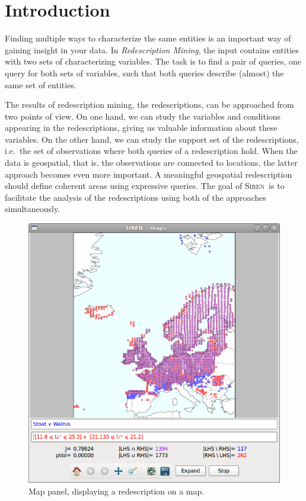 \documentclass{sig-alternate}
\newcommand{\note}[1]{{\color{red}#1}}
\newcommand{\Siren}{\textsc{Siren}}
\begin{document}

\section{Introduction}
Finding multiple ways to characterize the same entities is an
important way of gaining insight in your data.  In \emph{Redescription
Mining}, the input contains entities with two sets of characterizing
variables. The task is to find a pair of queries, one query for both
sets of variables, such that both queries describe (almost) the same
set of entities.

The results of redescription mining, the redescriptions, can be
approached from two points of view. On one hand, we can study the
variables and conditions appearing in the redescriptions, giving us
valuable information about these variables. On the other hand, we can
study the support set of the redescriptions, i.e.\ the set of
observations where both queries of a redescription hold. When the data
is geospatial, that is, the observations are connected to locations, the
latter approach becomes even more important. A meaningful geospatial
redescription should define coherent areas using expressive
queries. The goal of \Siren\ is to facilitate the analysis of the
redescriptions using both of the approaches simultaneously.

\begin{figure}[hb]
  \centering
\includegraphics[width=.5\textwidth]{screenshots/siren_map.png}
  \caption{Map panel, displaying a redescription on a map.}
  \label{fig:map_panel}
\end{figure}
\end{document}
